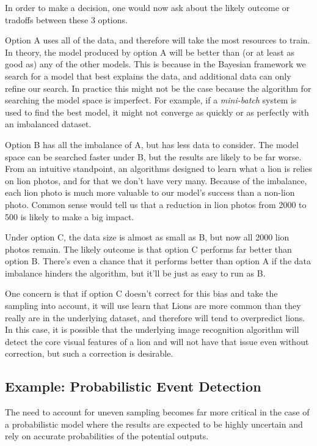\documentclass[twoside]{article}
\begin{document}
In order to make a decision, one would now ask about the likely outcome or tradoffs between these 3 options.

Option A uses all of the data, and therefore will take the most resources to train. In theory, the model produced by option A will be better than (or at least as good as) any of the other models. This is because in the Bayesian framework we search for a model that best explains the data, and additional data can only refine our search. In practice this might not be the case because the algorithm for searching the model space is imperfect. For example, if a \textit{mini-batch} system is used to find the best model, it might not converge as quickly or as perfectly with an imbalanced dataset.

Option B has all the imbalance of A, but has less data to consider. The model space can be searched faster under B, but the results are likely to be far worse. From an intuitive standpoint, an algorithms designed to learn what a lion is relies on lion photos, and for that we don't have very many. Because of the imbalance, each lion photo is much more valuable to our model's success than a non-lion photo. Common sense would tell us that a reduction in lion photos from 2000 to 500 is likely to make a big impact.

Under option C, the data size is almost as small as B, but now all 2000 lion photos remain. The likely outcome is that option C performs far better than option B. There's even a chance that it performs better than option A if the data imbalance hinders the algorithm, but it'll be just as easy to run as B.

One concern is that if option C doesn't correct for this bias and take the sampling into account, it will use learn that Lions are more common than they really are in the underlying dataset, and therefore will tend to overpredict lions. In this case, it is possible that the underlying image recognition algorithm will detect the core visual features of a lion and will not have that issue even without correction, but such a correction is desirable.

\subsection{Example: Probabilistic Event Detection}

The need to account for uneven sampling becomes far more critical in the case of a probabilistic model where the results are expected to be highly uncertain and rely on accurate probabilities of the potential outputs.
\end{document}
